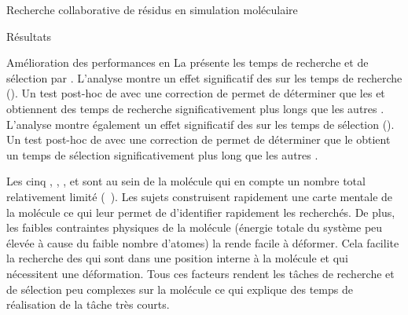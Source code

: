 \documentclass[myfrancais]{mythesis}
\begin{document}
\begin{mychapter}{Recherche collaborative de résidus en simulation moléculaire}
\begin{mysection}{Résultats}
\begin{mysubsection}{Amélioration des performances en }
				La  présente les temps de recherche et de sélection par  .
				L'analyse montre un effet significatif des   sur les temps de recherche ().
				Un test post-hoc de  avec une correction de  permet de déterminer que les   et  obtiennent des temps de recherche significativement plus longs que les autres .
				L'analyse montre également un effet significatif des   sur les temps de sélection ().
				Un test post-hoc de  avec une correction de  permet de déterminer que le   obtient un temps de sélection significativement plus long que les autres .

				Les cinq  , , ,  et  sont au sein de la molécule \myTRPCAGE qui en compte un nombre total relativement limité (~).
				Les sujets construisent rapidement une carte mentale de la molécule ce qui leur permet de d'identifier rapidement les  recherchés.
				De plus, les faibles contraintes physiques de la molécule (énergie totale du système peu élevée à cause du faible nombre d'atomes) la rende facile à déformer.
				Cela facilite la recherche des  qui sont dans une position interne à la molécule et qui nécessitent une déformation.
				Tous ces facteurs rendent les tâches de recherche et de sélection peu complexes sur la molécule \myTRPCAGE ce qui explique des temps de réalisation de la tâche très courts.


\end{mysubsection}
\end{mysection}
\end{mychapter}
\end{document}
